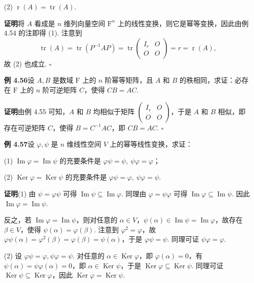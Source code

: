 \documentclass[UTF8, 12pt, fontset=fandol, oneside]{ctexart}
\begin{document}
(2) $\operatorname{r}(A)=\operatorname{tr}(A)$.

\noindent\textbf{证明}\quad 将 $A$ 看成是 $n$ 维列向量空间 $\mathrm{F}^n$ 上的线性变换，则它是幂等变换，因此由例 4.54 的注即得 (1). 注意到
\[
\operatorname{tr}(A)=\operatorname{tr}(P^{-1}AP)=\operatorname{tr}\left(\begin{array}{cc}
I_r & O\\
O & O
\end{array}\right)=r=\operatorname{r}(A),
\]
故 (2) 也成立. $\square$

\noindent\textbf{例 4.56}\quad 设 $A,B$ 是数域 $\mathrm{F}$ 上的 $n$ 阶幂等矩阵，且 $A$ 和 $B$ 的秩相同，求证：必存在 $\mathrm{F}$ 上的 $n$ 阶可逆矩阵 $C$，使得 $CB=AC$.

\noindent\textbf{证明}\quad 由例 4.55 可知，$A$ 和 $B$ 均相似于矩阵 $\left(\begin{array}{cc}I_r&O\\O&O\end{array}\right)$，于是 $A$ 和 $B$ 相似，即存在可逆矩阵 $C$，使得 $B=C^{-1}AC$，即 $CB=AC$. $\square$

\noindent\textbf{例 4.57}\quad 设 $\varphi,\psi$ 是 $n$ 维线性空间 $V$ 上的幂等线性变换，求证：

(1) $\operatorname{Im}\varphi=\operatorname{Im}\psi$ 的充要条件是 $\varphi\psi=\psi,\ \psi\varphi=\varphi$；

(2) $\operatorname{Ker}\varphi=\operatorname{Ker}\psi$ 的充要条件是 $\varphi\psi=\varphi,\ \psi\varphi=\psi$.

\noindent\textbf{证明}\quad (1) 由 $\psi=\varphi\psi$ 可得 $\operatorname{Im}\psi\subseteq\operatorname{Im}\varphi$. 同理由 $\varphi=\psi\varphi$ 可得 $\operatorname{Im}\varphi\subseteq\operatorname{Im}\psi$. 因此 $\operatorname{Im}\varphi=\operatorname{Im}\psi$.

反之，若 $\operatorname{Im}\varphi=\operatorname{Im}\psi$，则对任意的 $\alpha\in V$，$\psi(\alpha)\in\operatorname{Im}\psi=\operatorname{Im}\varphi$，故存在 $\beta\in V$，使得 $\psi(\alpha)=\varphi(\beta)$. 注意到 $\varphi^2=\varphi$，故 $\varphi\psi(\alpha)=\varphi^2(\beta)=\varphi(\beta)=\psi(\alpha)$，于是 $\varphi\psi=\psi$. 同理可证 $\psi\varphi=\varphi$.

(2) 设 $\varphi\psi=\varphi,\psi\varphi=\psi$. 对任意的 $\alpha\in\operatorname{Ker}\varphi$，即 $\varphi(\alpha)=0$，有 $\psi(\alpha)=\psi\varphi(\alpha)=0$，即 $\alpha\in\operatorname{Ker}\psi$，于是 $\operatorname{Ker}\varphi\subseteq\operatorname{Ker}\psi$. 同理可证 $\operatorname{Ker}\psi\subseteq\operatorname{Ker}\varphi$，因此 $\operatorname{Ker}\varphi=\operatorname{Ker}\psi$.
\end{document}
